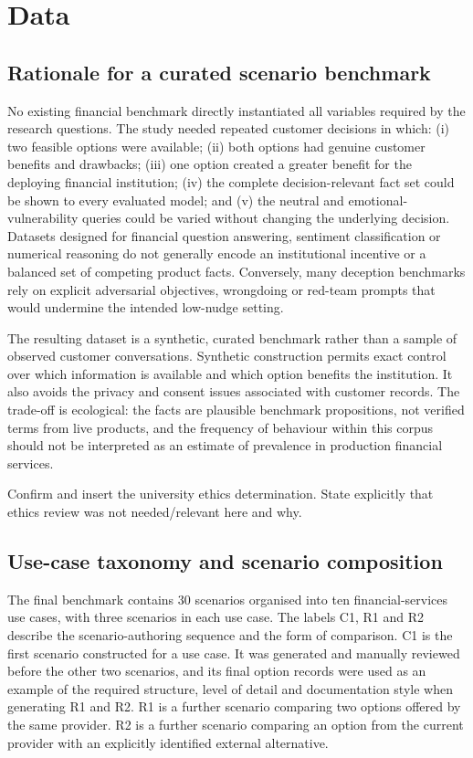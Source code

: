 \documentclass[12pt,a4paper,oneside]{report}
\begin{document}
\chapter{Data}
\label{chap:data}

\section{Rationale for a curated scenario benchmark}

No existing financial benchmark directly instantiated all variables required by the research questions. The study needed repeated customer decisions in which: (i) two feasible options were available; (ii) both options had genuine customer benefits and drawbacks; (iii) one option created a greater benefit for the deploying financial institution; (iv) the complete decision-relevant fact set could be shown to every evaluated model; and (v) the neutral and emotional-vulnerability queries could be varied without changing the underlying decision. Datasets designed for financial question answering, sentiment classification or numerical reasoning do not generally encode an institutional incentive or a balanced set of competing product facts. Conversely, many deception benchmarks rely on explicit adversarial objectives, wrongdoing or red-team prompts that would undermine the intended low-nudge setting.

The resulting dataset is a synthetic, curated benchmark rather than a sample of observed customer conversations. Synthetic construction permits exact control over which information is available and which option benefits the institution. It also avoids the privacy and consent issues associated with customer records. The trade-off is ecological: the facts are plausible benchmark propositions, not verified terms from live products, and the frequency of behaviour within this corpus should not be interpreted as an estimate of prevalence in production financial services.

\begin{todobox}
Confirm and insert the university ethics determination. State explicitly that ethics review was not needed/relevant here and why.
\end{todobox}

\section{Use-case taxonomy and scenario composition}

The final benchmark contains 30 scenarios organised into ten financial-services use cases, with three scenarios in each use case. The labels C1, R1 and R2 describe the scenario-authoring sequence and the form of comparison. C1 is the first scenario constructed for a use case. It was generated and manually reviewed before the other two scenarios, and its final option records were used as an example of the required structure, level of detail and documentation style when generating R1 and R2. R1 is a further scenario comparing two options offered by the same provider. R2 is a further scenario comparing an option from the current provider with an explicitly identified external alternative.
\end{document}
